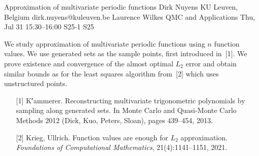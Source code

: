\begin{talk}
  {Approximation of multivariate periodic functions}%
  {Dirk Nuyens}%
  {KU Leuven, Belgium}%
  {dirk.nuyens@kuleuven.be}%
  {Laurence Wilkes}%
  {QMC and Applications}%
  {Thu, Jul 31 15:30–16:00}%
  {S25-1}%
  {S25}%
				
			
  We study approximation of multivariate periodic functions using $n$
  function values. We use generated sets as the sample points, first
  introduced in~[1]. We prove existence and convergence of the almost
  optimal $L_2$ error and obtain similar bounds as for the least squares
  algorithm from~[2] which uses unstructured points.

\medskip

\begin{enumerate}
  \item[{[1]}]
    K{\''a}mmerer.
    Reconstructing multivariate trigonometric polynomials by sampling along generated sets.
    In Monte Carlo and Quasi-Monte Carlo Methods 2012 (Dick, Kuo, Peters, Sloan), pages 439--454, 2013.
  \item[{[2]}]
    Krieg, Ullrich.
    Function values are enough for $L_2$ approximation.
    \emph{Foundations of Computational Mathematics}, 21(4):1141--1151, 2021.
\end{enumerate}

\end{talk}

